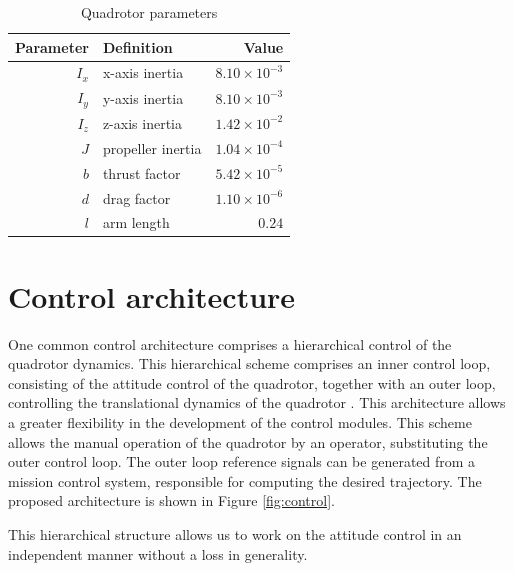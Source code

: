 \documentclass[12pt]{article}
\begin{document}
\begin{table}
  \begin{center}
    \caption{Quadrotor parameters}\label{tab:parameters}
    \begin{tabular}{rlr}
      \hline
      Parameter & Definition & Value \\
      \hline                  
      $I_x$ & x-axis inertia & $8.10 \times {10}^{-3}$\\
      $I_y$ & y-axis inertia & $8.10 \times {10}^{-3}$\\
      $I_z$ & z-axis inertia & $1.42 \times {10}^{-2}$ \\
      $J$ & propeller inertia & $1.04 \times {10}^{-4}$ \\
      $b$ & thrust factor & $ 5.42 \times {10}^{-5}$ \\
      $d$ & drag factor & $ 1.10 \times{10}^{-6}$ \\
      $l$ & arm length & $0.24$ \\
      \hline
    \end{tabular}
  \end{center}
\end{table}

\section{Control architecture}
One common control architecture comprises a hierarchical control of the quadrotor dynamics. This hierarchical scheme comprises an inner control loop, consisting of the attitude control of the quadrotor, together with an outer loop, controlling the translational dynamics of the quadrotor \cite{Raff10}. This architecture allows a greater flexibility in the development of the control modules. This scheme allows the manual operation of the quadrotor by an operator, substituting the outer control loop. The outer loop reference signals can be generated from a mission control system, responsible for computing the desired trajectory. The proposed architecture is shown in Figure \ref{fig:control}.

This hierarchical structure allows us to work on the attitude control in an independent manner without a loss in generality.
\end{document}
